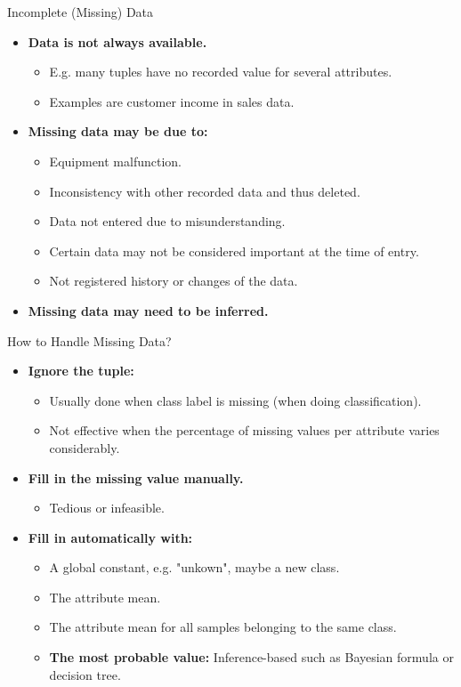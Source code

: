 \begin{frame}{Incomplete (Missing) Data}
	\begin{itemize}
		\item \textbf{Data is not always available.}
		\begin{itemize}
			\item E.g. many tuples have no recorded value for several 
			attributes.
			\item Examples are customer income in sales data.
		\end{itemize}
		\item \textbf{Missing data may be due to:}
		\begin{itemize}
			\item Equipment malfunction.
			\item Inconsistency with other recorded data and thus deleted.
			\item Data not entered due to misunderstanding.
			\item Certain data may not be considered important at the time of 
			entry.
			\item Not registered history or changes of the data.
		\end{itemize}
		\item \textbf{Missing data may need to be inferred.}
	\end{itemize}
\end{frame}

\begin{frame}{How to Handle Missing Data?}
	\begin{itemize}
		\item \textbf{Ignore the tuple:}
		\begin{itemize}
			\item Usually done when class label is missing (when doing 
			classification).
			\item Not effective when the percentage of missing values per 
			attribute varies considerably.
		\end{itemize}
		\item \textbf{Fill in the missing value manually.}
		\begin{itemize}
			\item Tedious or infeasible.
		\end{itemize}
		\item \textbf{Fill in automatically with:}
		\begin{itemize}
			\item A global constant, e.g. "unkown", maybe a new class.
			\item The attribute mean.
			\item The attribute mean for all samples belonging to the same 
			class.
			\item \textbf{\color{airforceblue} The most probable value:} 
			Inference-based such as Bayesian formula or decision tree.
		\end{itemize}
	\end{itemize}
\end{frame}

